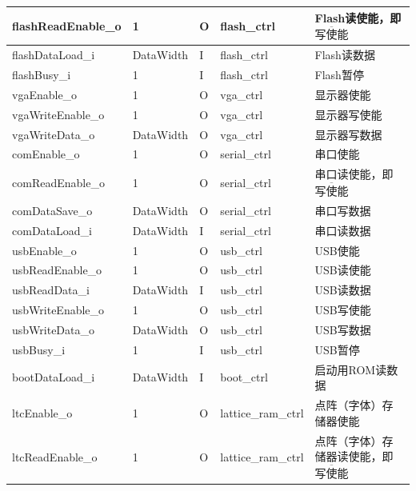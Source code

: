 \documentclass{article}
\begin{document}
\begin{spacing}{1.4}
\begin{longtable}{l|l|l|l|p{5cm}}
\hline flashReadEnable\_o      & 1                      & O     & flash\_ctrl       & Flash读使能，即$\overline{\text{写使能}}$ \\
\hline flashDataLoad\_i        & DataWidth              & I     & flash\_ctrl       & Flash读数据 \\
\hline flashBusy\_i            & 1                      & I     & flash\_ctrl       & Flash暂停 \\
\hline vgaEnable\_o            & 1                      & O     & vga\_ctrl         & 显示器使能 \\
\hline vgaWriteEnable\_o       & 1                      & O     & vga\_ctrl         & 显示器写使能 \\
\hline vgaWriteData\_o         & DataWidth              & O     & vga\_ctrl         & 显示器写数据 \\
\hline comEnable\_o            & 1                      & O     & serial\_ctrl      & 串口使能 \\
\hline comReadEnable\_o        & 1                      & O     & serial\_ctrl      & 串口读使能，即$\overline{\text{写使能}}$ \\
\hline comDataSave\_o          & DataWidth              & O     & serial\_ctrl      & 串口写数据 \\
\hline comDataLoad\_i          & DataWidth              & I     & serial\_ctrl      & 串口读数据 \\
\hline usbEnable\_o            & 1                      & O     & usb\_ctrl         & USB使能 \\
\hline usbReadEnable\_o        & 1                      & O     & usb\_ctrl         & USB读使能 \\
\hline usbReadData\_i          & DataWidth              & I     & usb\_ctrl         & USB读数据 \\
\hline usbWriteEnable\_o       & 1                      & O     & usb\_ctrl         & USB写使能 \\
\hline usbWriteData\_o         & DataWidth              & O     & usb\_ctrl         & USB写数据 \\
\hline usbBusy\_i              & 1                      & I     & usb\_ctrl         & USB暂停 \\
\hline bootDataLoad\_i         & DataWidth              & I     & boot\_ctrl        & 启动用ROM读数据 \\
\hline ltcEnable\_o            & 1                      & O     & lattice\_ram\_ctrl& 点阵（字体）存储器使能 \\
\hline ltcReadEnable\_o        & 1                      & O     & lattice\_ram\_ctrl& 点阵（字体）存储器读使能，即$\overline{\text{写使能}}$ \\

\end{longtable}
\end{spacing}
\end{document}
